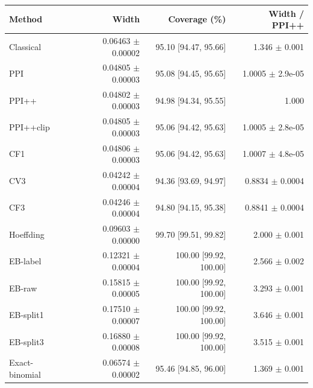 \small
\begin{tabular}{lrrr}
\toprule
Method & Width & Coverage (\%) & Width / PPI++ \\
\midrule
Classical & 0.06463 $\pm$ 0.00002 & 95.10 [94.47, 95.66] & 1.346 $\pm$ 0.001 \\
PPI & 0.04805 $\pm$ 0.00003 & 95.08 [94.45, 95.65] & 1.0005 $\pm$ 2.9e-05 \\
PPI++ & 0.04802 $\pm$ 0.00003 & 94.98 [94.34, 95.55] & 1.000 \\
PPI++clip & 0.04805 $\pm$ 0.00003 & 95.06 [94.42, 95.63] & 1.0005 $\pm$ 2.8e-05 \\
CF1 & 0.04806 $\pm$ 0.00003 & 95.06 [94.42, 95.63] & 1.0007 $\pm$ 4.8e-05 \\
CV3 & 0.04242 $\pm$ 0.00004 & 94.36 [93.69, 94.97] & 0.8834 $\pm$ 0.0004 \\
CF3 & 0.04246 $\pm$ 0.00004 & 94.80 [94.15, 95.38] & 0.8841 $\pm$ 0.0004 \\
Hoeffding & 0.09603 $\pm$ 0.00000 & 99.70 [99.51, 99.82] & 2.000 $\pm$ 0.001 \\
EB-label & 0.12321 $\pm$ 0.00004 & 100.00 [99.92, 100.00] & 2.566 $\pm$ 0.002 \\
EB-raw & 0.15815 $\pm$ 0.00005 & 100.00 [99.92, 100.00] & 3.293 $\pm$ 0.001 \\
EB-split1 & 0.17510 $\pm$ 0.00007 & 100.00 [99.92, 100.00] & 3.646 $\pm$ 0.001 \\
EB-split3 & 0.16880 $\pm$ 0.00008 & 100.00 [99.92, 100.00] & 3.515 $\pm$ 0.001 \\
Exact-binomial & 0.06574 $\pm$ 0.00002 & 95.46 [94.85, 96.00] & 1.369 $\pm$ 0.001 \\
\bottomrule
\end{tabular}
